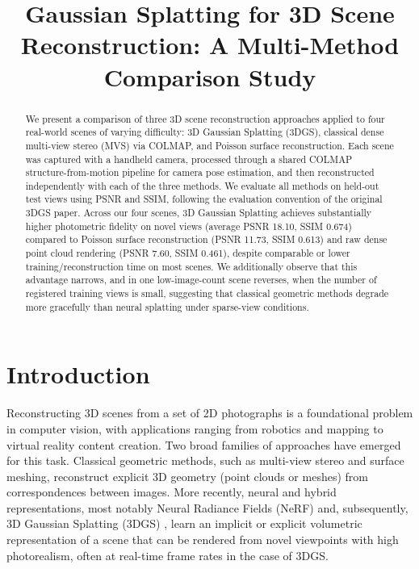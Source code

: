 \documentclass[conference]{IEEEtran}
\begin{document}
\title{Gaussian Splatting for 3D Scene Reconstruction: A Multi-Method Comparison Study}

\author{
}

\maketitle

\begin{abstract}
We present a comparison of three 3D scene reconstruction approaches applied to four real-world scenes of varying difficulty: 3D Gaussian Splatting (3DGS), classical dense multi-view stereo (MVS) via COLMAP, and Poisson surface reconstruction. Each scene was captured with a handheld camera, processed through a shared COLMAP structure-from-motion pipeline for camera pose estimation, and then reconstructed independently with each of the three methods. We evaluate all methods on held-out test views using PSNR and SSIM, following the evaluation convention of the original 3DGS paper. Across our four scenes, 3D Gaussian Splatting achieves substantially higher photometric fidelity on novel views (average PSNR 18.10, SSIM 0.674) compared to Poisson surface reconstruction (PSNR 11.73, SSIM 0.613) and raw dense point cloud rendering (PSNR 7.60, SSIM 0.461), despite comparable or lower training/reconstruction time on most scenes. We additionally observe that this advantage narrows, and in one low-image-count scene reverses, when the number of registered training views is small, suggesting that classical geometric methods degrade more gracefully than neural splatting under sparse-view conditions.
\end{abstract}

\section{Introduction}

Reconstructing 3D scenes from a set of 2D photographs is a foundational problem in computer vision, with applications ranging from robotics and mapping to virtual reality content creation. Two broad families of approaches have emerged for this task. Classical geometric methods, such as multi-view stereo and surface meshing, reconstruct explicit 3D geometry (point clouds or meshes) from correspondences between images. More recently, neural and hybrid representations, most notably Neural Radiance Fields (NeRF) \cite{mildenhall2020nerf} and, subsequently, 3D Gaussian Splatting (3DGS) \cite{kerbl2023splatting}, learn an implicit or explicit volumetric representation of a scene that can be rendered from novel viewpoints with high photorealism, often at real-time frame rates in the case of 3DGS.
\end{document}
